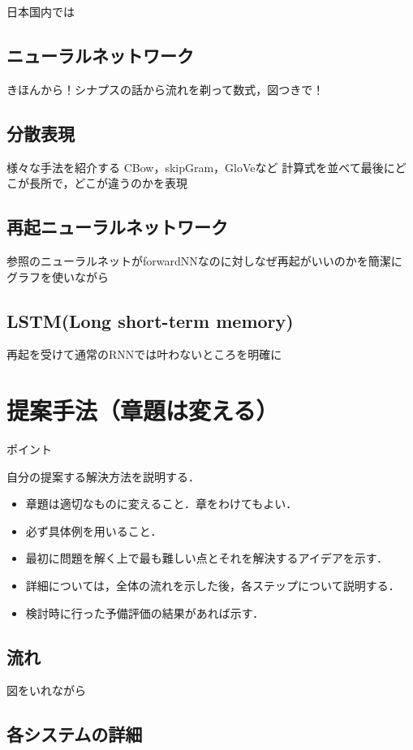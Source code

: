 \documentclass[a4j,11pt,report]{jsbook}
\newcommand{\point}[1]{
\begin{itembox}[l]{ポイント}
  #1
\end{itembox}
}
\begin{document}
日本国内では

\section{ニューラルネットワーク}
きほんから！シナプスの話から流れを剃って数式，図つきで！


\section{分散表現}
様々な手法を紹介する
CBow，skipGram，GloVeなど
計算式を並べて最後にどこが長所で，どこが違うのかを表現


\section{再起ニューラルネットワーク}

参照のニューラルネットがforwardNNなのに対しなぜ再起がいいのかを簡潔に
グラフを使いながら

\section{LSTM(Long short-term memory)}

再起を受けて通常のRNNでは叶わないところを明確に





\chapter{提案手法（章題は変える）\label{ch:method}}
\point{
自分の提案する解決方法を説明する．
\begin{itemize}
  \item 章題は適切なものに変えること．章をわけてもよい．
  \item 必ず具体例を用いること．
  \item 最初に問題を解く上で最も難しい点とそれを解決するアイデアを示す．
  \item 詳細については，全体の流れを示した後，各ステップについて説明する．
  \item 検討時に行った予備評価の結果があれば示す．
\end{itemize}
}

\section{流れ}
図をいれながら
\section{各システムの詳細}
\end{document}
